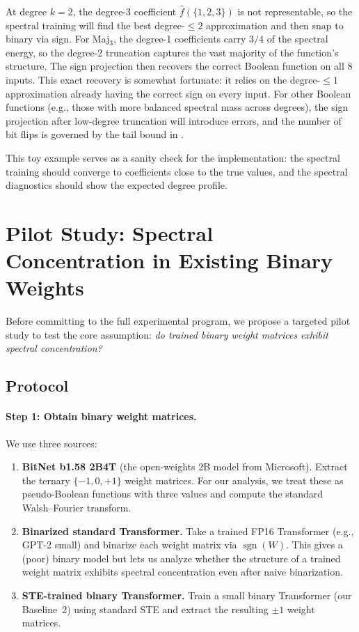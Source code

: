 \documentclass[12pt,a4paper]{article}
\theoremstyle{plain}
\theoremstyle{definition}
\theoremstyle{remark}
\newcommand{\fhat}{\widehat{f}}
\newcommand{\sgn}{\operatorname{sgn}}
\begin{document}
At degree $k = 2$, the degree-3 coefficient $\fhat(\{1,2,3\})$ is not representable, so the spectral training will find the best degree-$\leq 2$ approximation and then snap to binary via sign. For Maj$_3$, the degree-1 coefficients carry $3/4$ of the spectral energy, so the degree-2 truncation captures the vast majority of the function's structure. The sign projection then recovers the correct Boolean function on all 8 inputs. This exact recovery is somewhat fortunate: it relies on the degree-$\leq 1$ approximation already having the correct sign on every input. For other Boolean functions (e.g., those with more balanced spectral mass across degrees), the sign projection after low-degree truncation will introduce errors, and the number of bit flips is governed by the tail bound in .

This toy example serves as a sanity check for the implementation: the spectral training should converge to coefficients close to the true values, and the spectral diagnostics should show the expected degree profile.


\newpage
\section{Pilot Study: Spectral Concentration in Existing Binary Weights}\label{sec:pilot}

Before committing to the full experimental program, we propose a targeted pilot study to test the core assumption: \emph{do trained binary weight matrices exhibit spectral concentration?}

\subsection{Protocol}\label{sec:pilot-protocol}

\paragraph{Step 1: Obtain binary weight matrices.}
We use three sources:
\begin{enumerate}[label=(\alph*)]
    \item \textbf{BitNet b1.58 2B4T} (the open-weights 2B model from Microsoft). Extract the ternary $\{-1, 0, +1\}$ weight matrices. For our analysis, we treat these as pseudo-Boolean functions with three values and compute the standard Walsh--Fourier transform.
    \item \textbf{Binarized standard Transformer.} Take a trained FP16 Transformer (e.g., GPT-2 small) and binarize each weight matrix via $\sgn(W)$. This gives a (poor) binary model but lets us analyze whether the structure of a trained weight matrix exhibits spectral concentration even after naive binarization.
    \item \textbf{STE-trained binary Transformer.} Train a small binary Transformer (our Baseline~2) using standard STE and extract the resulting $\pm 1$ weight matrices.
\end{enumerate}
\end{document}
